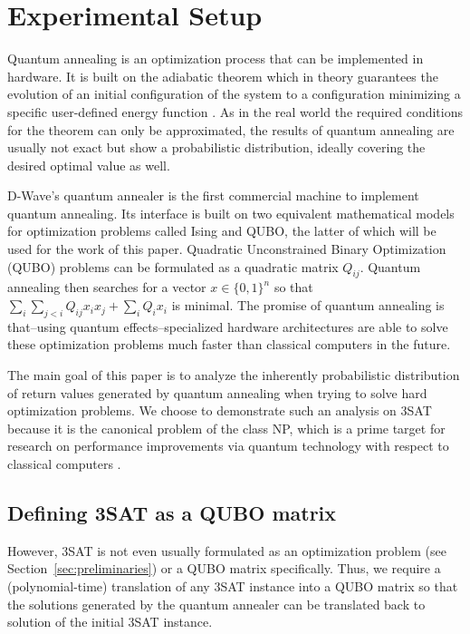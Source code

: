 \section{Experimental Setup}
\label{sec:exp-setup}

Quantum annealing is an optimization process that can be implemented in hardware. It is built on the adiabatic theorem which in theory guarantees the evolution of an initial configuration of the system to a configuration minimizing a specific user-defined energy function \cite{mcgeoch2014adiabatic}. As in the real world the required conditions for the theorem can only be approximated, the results of quantum annealing are usually not exact but show a probabilistic distribution, ideally covering the desired optimal value as well.

D-Wave's quantum annealer is the first commercial machine to implement quantum annealing. Its interface is built on two equivalent mathematical models for optimization problems called Ising and QUBO, the latter of which will be used for the work of this paper. Quadratic Unconstrained Binary Optimization (QUBO) problems can be formulated as a quadratic matrix $Q_{ij}$. Quantum annealing then searches for a vector $x \in \{0,1\}^n$ so that $\sum_i \sum_{j < i} Q_{ij} x_i x_j + \sum_i Q_i x_i$ is minimal. The promise of quantum annealing is that--using quantum effects--specialized hardware architectures are able to solve these optimization problems much faster than classical computers in the future.

The main goal of this paper is to analyze the inherently probabilistic distribution of return values generated by quantum annealing when trying to solve hard optimization problems. We choose to demonstrate such an analysis on 3SAT because it is the canonical problem of the class NP, which is a prime target for research on performance improvements via quantum technology with respect to classical computers \cite{mcgeoch2013experimental,lucas2014ising}.

\subsection{Defining 3SAT as a QUBO matrix}

However, 3SAT is not even usually formulated as an optimization problem (see Section~\ref{sec:preliminaries}) or a QUBO matrix specifically. Thus, we require a (polynomial-time) translation of any 3SAT instance into a QUBO matrix so that the solutions generated by the quantum annealer can be translated back to solution of the initial 3SAT instance.

